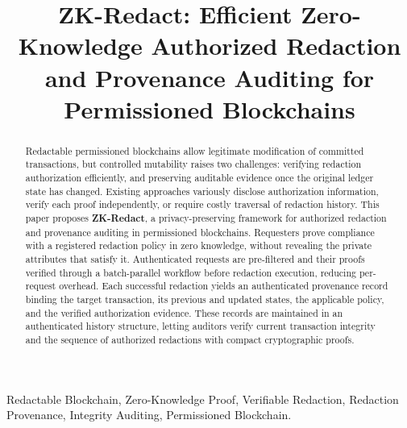 \documentclass[lettersize,journal]{IEEEtran}
\begin{document}
\title{ZK-Redact: Efficient Zero-Knowledge Authorized Redaction and Provenance Auditing for Permissioned Blockchains}


\author{
}

\maketitle

\begin{abstract}
Redactable permissioned blockchains allow legitimate modification of
committed transactions, but controlled mutability raises two challenges:
verifying redaction authorization efficiently, and preserving auditable
evidence once the original ledger state has changed. Existing approaches
variously disclose authorization information, verify each proof
independently, or require costly traversal of redaction history. This
paper proposes \textbf{ZK-Redact}, a privacy-preserving framework for
authorized redaction and provenance auditing in permissioned
blockchains. Requesters prove compliance with a registered redaction
policy in zero knowledge, without revealing the private attributes that
satisfy it. Authenticated requests are pre-filtered and their proofs
verified through a batch-parallel workflow before redaction execution,
reducing per-request overhead. Each successful redaction yields an
authenticated provenance record binding the target transaction, its
previous and updated states, the applicable policy, and the verified
authorization evidence. These records are maintained in an authenticated
history structure, letting auditors verify current transaction integrity
and the sequence of authorized redactions with compact cryptographic
proofs.
\end{abstract}


\begin{IEEEkeywords}
Redactable Blockchain, Zero-Knowledge Proof, Verifiable Redaction, Redaction Provenance, Integrity Auditing,
Permissioned Blockchain.
\end{IEEEkeywords}
\end{document}
